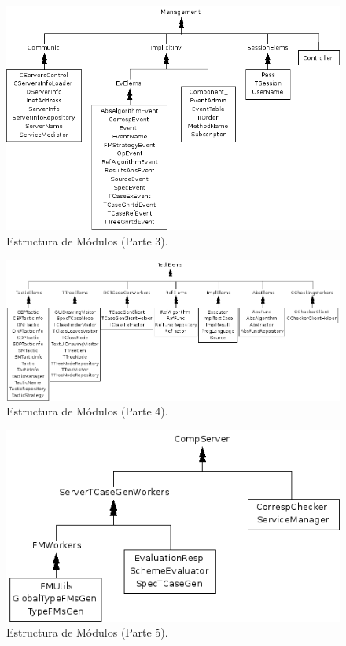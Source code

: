\documentclass[a4paper,11pt]{article}
\begin{document}
\begin{figure}
\begin{center}
\includegraphics[scale=0.6]{./EstrucModulos03.png}
\end{center}
\caption{Estructura de Módulos (Parte 3).}
\end{figure}


\begin{figure}
\begin{center}
\includegraphics[scale=0.6]{./EstrucModulos04.png}
\end{center}
\caption{Estructura de Módulos (Parte 4).}
\end{figure}


\begin{figure}
\begin{center}
\includegraphics[scale=0.6]{./EstrucModulos05.png}
\end{center}
\caption{Estructura de Módulos (Parte 5).}
\end{figure}
\end{document}
